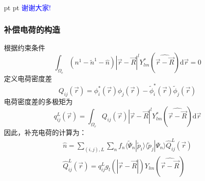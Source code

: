 \documentclass[cjk,slidestop,compress,mathserif,blue]{beamer}
\begin{document}

\logo{}									%
\frame
{
 pt
 pt
\hskip 60pt \textcolor{blue}{\Huge 谢谢大家\:!}
}

\appendix
\frame
{
	\frametitle{补偿电荷的构造}
	根据约束条件
	\begin{displaymath}
		\int_{\Omega_c}(n^1-\tilde n^1-\hat n)|\vec r-\vec R|^lY_{lm}^{\ast}(\widehat{\vec r-\vec R})\mathrm{d}\vec r=0
	\end{displaymath}
	定义电荷密度差
	\begin{displaymath}
		Q_{ij}(\vec r)=\phi_i^{\ast}(\vec r)\phi_j(\vec r)-\tilde\phi_i^{\ast}(\vec r)\tilde\phi_j(\vec r)
	\end{displaymath}
	电荷密度差的多极矩为
	\begin{displaymath}
		q_{ij}^L(\vec r)=\int_{\Omega_r}Q_{ij}(\vec r)|\vec r-\vec R|^lY_{lm}^{\ast}(\widehat{\vec r-\vec R})\mathrm{d}\vec r
	\end{displaymath}
	因此，补充电荷的计算为：
	\begin{displaymath}
		\begin{aligned}
			\hat n=\sum_{(i,j),L}\sum_n f_n\langle\tilde\Psi_n|\tilde p_i\rangle\langle\tilde p_j|\Psi_n\rangle\hat Q_{ij}^L(\vec r)\\
			\hat Q_{ij}^L(\vec r)=q_{ij}^Lg_l(|\vec r-\vec R|)Y_{lm}(\widehat{\vec r-\vec R})
		\end{aligned}
	\end{displaymath}
}
\end{document}
